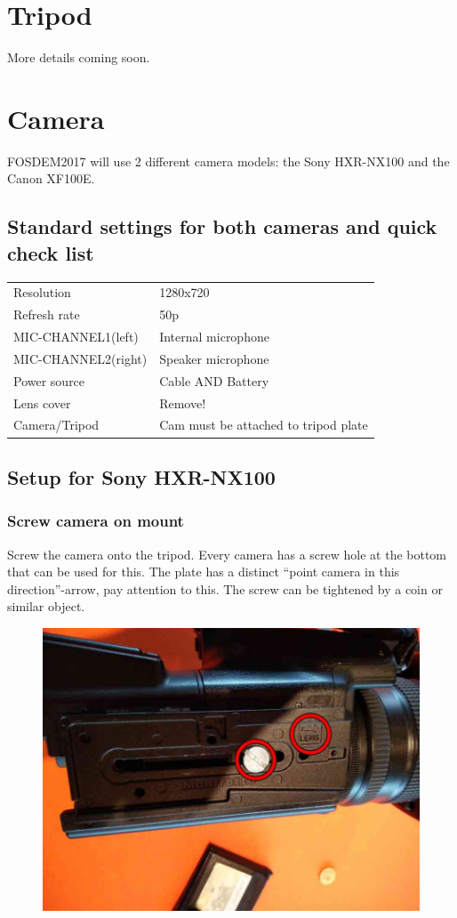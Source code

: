 \documentclass{article}
\begin{document}
\section{Tripod}
More details coming soon.

\section{Camera}
FOSDEM2017 will use 2 different camera models: the Sony HXR-NX100 and the Canon XF100E.

\subsection{Standard settings for both cameras and quick check list}
\begin{tabular}{| l | l |}
Resolution & 1280x720 \\
Refresh rate & 50p \\
MIC-CHANNEL1(left) & Internal microphone \\
MIC-CHANNEL2(right) & Speaker microphone \\
Power source & Cable AND Battery \\
Lens cover & Remove! \\
Camera/Tripod & Cam must be attached to tripod plate \\
\end{tabular}

\subsection{Setup for Sony HXR-NX100}

\subsubsection{Screw camera on mount}
Screw the camera onto the tripod. Every camera has a screw hole at the bottom that can be used for this. The plate has a distinct ``point camera in this direction''-arrow, pay attention to this. The screw can be tightened by a coin or similar object.

\begin{figure}[H]
  \centering
  \includegraphics[width = 120mm]{Cam00.jpg}
\end{figure}
\end{document}
